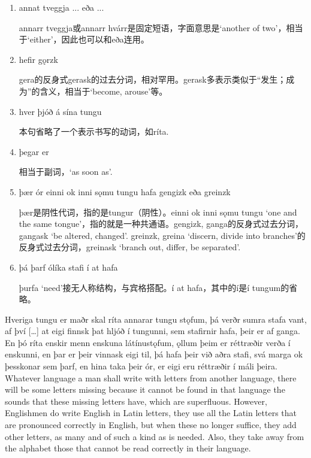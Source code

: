 \begin{grammar*}{}
  \begin{enumerate}[leftmargin=*]
    \item annat tveggja ... eða ...

          annarr tveggja或annarr hvárr是固定短语，字面意思是`another of two'，相当于`either'，因此也可以和eða连用。

    \item hefir gǫrzk

          gera的反身式gerask的过去分词，相对罕用。gerask多表示类似于“发生；成为”的含义，相当于`become, arouse'等。

    \item hver þjóð á sína tungu

          本句省略了一个表示书写的动词，如ríta.

    \item þegar er

          相当于副词，`as soon as'.

    \item þær ór einni ok inni sǫmu tungu hafa gengizk eða greinzk

          þær是阴性代词，指的是tungur（阴性）。einni ok inni sǫmu tungu `one and the same tongue'，指的就是一种共通语。gengizk, ganga的反身式过去分词，gangask `be altered, changed'. greinzk, greina `discern, divide into branches'的反身式过去分词，greinask `branch out, differ, be separated'.

    \item þá þarf ólíka stafi í at hafa

          þurfa `need'接无人称结构，与宾格搭配。í at hafa，其中的í是í tungum的省略。
  \end{enumerate}
\end{grammar*}
\begin{paracol}{2}
  Hveriga tungu er maðr skal ríta annarar tungu stǫfum, þá verðr sumra stafa vant, af því […] at eigi finnsk þat hljóð í tungunni, sem stafirnir hafa, þeir er af ganga. En þó ríta enskir menn enskuna látínustǫfum, ǫllum þeim er réttræðir verða í enskunni, en þar er þeir vinnask eigi til, þá hafa þeir við aðra stafi, svá marga ok þesskonar sem þarf, en hina taka þeir ór, er eigi eru réttræðir í máli þeira.
  \switchcolumn
  Whatever language a man shall write with letters from another language, there will be some letters missing because it cannot be found in that language the sounds that these missing letters have, which are superfluous. However, Englishmen do write English in Latin letters, they use all the Latin letters that are pronounced correctly in English, but when these no longer suffice, they add other letters, as many and of such a kind as is needed. Also, they take away from the alphabet those that cannot be read correctly in their language.
\end{paracol}
